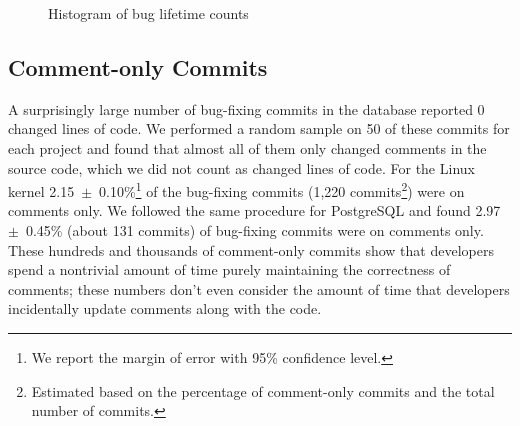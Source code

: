 \begin{figure}[tbh]
\centering
{}
\caption{\label{fig-bug-lifetime}Histogram of bug lifetime counts}
\end{figure}

\subsection{Comment-only Commits}
\label{sec-comment-only}

A surprisingly large number of bug-fixing commits in the database reported 0
changed lines of code. We performed a random sample on 50 of these commits for
each project and found that almost all of them only changed comments in the
source code, which we did not count as changed lines of code. For the Linux
kernel 2.15~$\pm$~0.10\%\footnote{We report the margin of error with 95\%
 confidence level.} of the bug-fixing commits (1,220
commits\footnote{Estimated based on the percentage of comment-only commits and
 the total number of commits.}) were on comments only. We followed the same
procedure for PostgreSQL and found 2.97~$\pm$~0.45\% (about 131 commits) of
bug-fixing commits were on comments only. These hundreds and thousands of
comment-only commits show that developers spend a nontrivial amount of time
purely maintaining the correctness of comments; these numbers don't even
consider the amount of time that developers incidentally update comments along
with the code.

